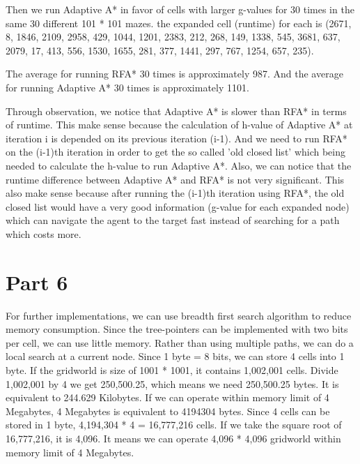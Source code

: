 \documentclass{article}
\begin{document}
Then we run Adaptive A* in favor of cells with larger g-values for 30 times in the same 30 different 101 * 101 mazes. the expanded cell (runtime) for each is
(2671, 8, 1846, 2109, 2958, 429, 1044, 1201, 2383, 212, 268, 149, 1338, 545, 3681, 637, 2079, 17, 413, 556, 1530, 1655, 281, 377, 1441, 297, 767, 1254, 657, 235).

The average for running RFA* 30 times is approximately 987. And the average for running Adaptive A* 30 times is approximately 1101.

Through observation, we notice that Adaptive A* is slower than RFA* in terms of runtime. This make sense because the calculation of h-value of Adaptive A* at iteration i is depended on its previous iteration (i-1). And we need to run RFA* on the (i-1)th iteration in order to get the so called 'old closed list' which being needed to calculate the h-value to run Adaptive A*. Also, we can notice that the runtime difference between Adaptive A* and RFA* is not very significant. This also make sense because after running the (i-1)th iteration using RFA*, the old closed list would have a very good information (g-value for each expanded node) which can navigate the agent to the target fast instead of searching for a path which costs more.

\section*{Part 6}
\hspace{5mm}
For further implementations, we can use breadth first search algorithm to reduce memory consumption. Since the tree-pointers can be implemented with two bits per cell, we can use little memory.  Rather than using multiple paths, we can do a local search at a current node. Since 1 byte = 8 bits, we can store 4 cells into 1 byte. If the gridworld is size of 1001 * 1001, it contains 1,002,001 cells. Divide 1,002,001 by 4 we get 250,500.25, which means we need 250,500.25 bytes. It is equivalent to 244.629 Kilobytes. If we can operate within memory limit of 4 Megabytes, 4 Megabytes is equivalent to 4194304 bytes. Since 4 cells can be stored in 1 byte, 4,194,304 * 4 = 16,777,216 cells. If we take the square root of 16,777,216, it is 4,096. It means we can operate 4,096 * 4,096 gridworld within memory limit of 4 Megabytes.
\end{document}
